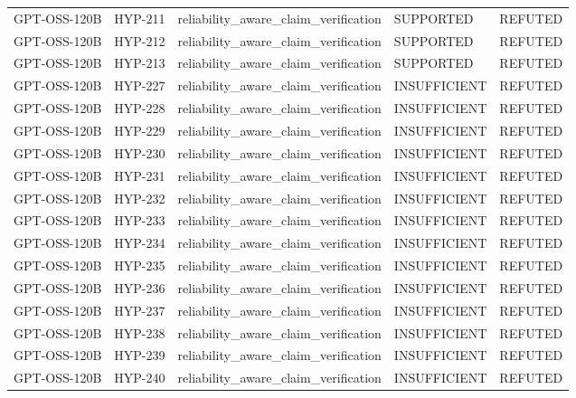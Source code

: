 \begin{tabular}{lllll}
GPT-OSS-120B & HYP-211 & reliability_aware_claim_verification & SUPPORTED & REFUTED \\
GPT-OSS-120B & HYP-212 & reliability_aware_claim_verification & SUPPORTED & REFUTED \\
GPT-OSS-120B & HYP-213 & reliability_aware_claim_verification & SUPPORTED & REFUTED \\
GPT-OSS-120B & HYP-227 & reliability_aware_claim_verification & INSUFFICIENT & REFUTED \\
GPT-OSS-120B & HYP-228 & reliability_aware_claim_verification & INSUFFICIENT & REFUTED \\
GPT-OSS-120B & HYP-229 & reliability_aware_claim_verification & INSUFFICIENT & REFUTED \\
GPT-OSS-120B & HYP-230 & reliability_aware_claim_verification & INSUFFICIENT & REFUTED \\
GPT-OSS-120B & HYP-231 & reliability_aware_claim_verification & INSUFFICIENT & REFUTED \\
GPT-OSS-120B & HYP-232 & reliability_aware_claim_verification & INSUFFICIENT & REFUTED \\
GPT-OSS-120B & HYP-233 & reliability_aware_claim_verification & INSUFFICIENT & REFUTED \\
GPT-OSS-120B & HYP-234 & reliability_aware_claim_verification & INSUFFICIENT & REFUTED \\
GPT-OSS-120B & HYP-235 & reliability_aware_claim_verification & INSUFFICIENT & REFUTED \\
GPT-OSS-120B & HYP-236 & reliability_aware_claim_verification & INSUFFICIENT & REFUTED \\
GPT-OSS-120B & HYP-237 & reliability_aware_claim_verification & INSUFFICIENT & REFUTED \\
GPT-OSS-120B & HYP-238 & reliability_aware_claim_verification & INSUFFICIENT & REFUTED \\
GPT-OSS-120B & HYP-239 & reliability_aware_claim_verification & INSUFFICIENT & REFUTED \\
GPT-OSS-120B & HYP-240 & reliability_aware_claim_verification & INSUFFICIENT & REFUTED \\
\bottomrule
\end{tabular}
